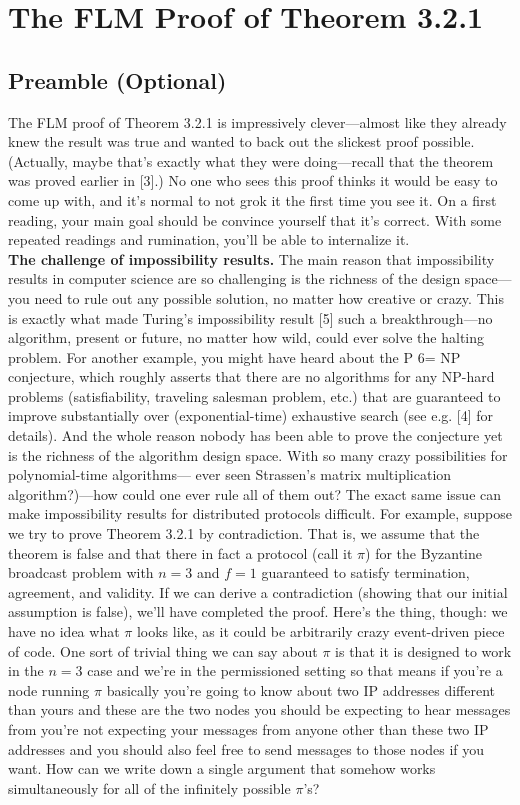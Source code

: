 \section{The FLM Proof of Theorem 3.2.1}
\subsection{Preamble (Optional)}
The FLM proof of Theorem 3.2.1 is impressively clever—almost like they already knew the
result was true and wanted to back out the slickest proof possible. (Actually, maybe that’s
exactly what they were doing—recall that the theorem was proved earlier in [3].) No one
who sees this proof thinks it would be easy to come up with, and it’s normal to not grok it
the first time you see it. On a first reading, your main goal should be convince yourself that it’s correct. With some repeated readings and rumination, you’ll be able to internalize it.\\


\noindent
\textbf{The challenge of impossibility results.} The main reason that impossibility results in
computer science are so challenging is the richness of the design space—you need to rule
out any possible solution, no matter how creative or crazy. This is exactly what made
Turing’s impossibility result [5] such a breakthrough—no algorithm, present or future, no
matter how wild, could ever solve the halting problem. For another example, you might have
heard about the P 6= NP conjecture, which roughly asserts that there are no algorithms for
any NP-hard problems (satisfiability, traveling salesman problem, etc.) that are guaranteed
to improve substantially over (exponential-time) exhaustive search (see e.g. [4] for details).
And the whole reason nobody has been able to prove the conjecture yet is the richness of the
algorithm design space. With so many crazy possibilities for polynomial-time algorithms—
ever seen Strassen’s matrix multiplication algorithm?)—how could one ever rule all of them
out?
The exact same issue can make impossibility results for distributed protocols difficult.
For example, suppose we try to prove Theorem 3.2.1 by contradiction. That is, we assume
that the theorem is false and that there in fact a protocol (call it $\pi$) for the Byzantine
broadcast problem with $n = 3$ and $f = 1$ guaranteed to satisfy termination, agreement, and
validity. If we can derive a contradiction (showing that our initial assumption is false), we’ll
have completed the proof. Here’s the thing, though: we have no idea what $\pi$ looks like, as
it could be arbitrarily crazy event-driven piece of code. One sort of trivial thing we can
say about $\pi$ is that it is designed to work in the $n = 3$ case and we're in the permissioned setting so that means if you're a node running $\pi$ basically you're going to know about two IP addresses different than yours
and these are the two nodes you should be expecting to hear messages from you're not expecting your messages from anyone other than these two IP addresses
and you should also feel free to send messages to those nodes if you want. How can we write down a single
argument that somehow works simultaneously for all of the infinitely possible $\pi$’s?\\

